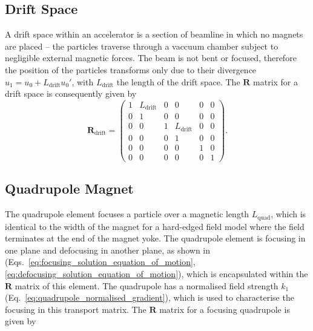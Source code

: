 \documentclass[../main.tex]{subfiles}
\begin{document}
\subsection{Drift Space}

A drift space within an accelerator is a section of beamline in which no magnets are placed -- the particles traverse through a vaccuum chamber subject to negligible external magnetic forces. The beam is not bent or focused, therefore the position of the particles transforms only due to their divergence $u_{1} = u_{0} + L_{\mathrm{drift}}u_{0}'$, with $L_{\mathrm{drift}}$ the length of the drift space. The $\boldsymbol{R}$ matrix for a drift space is consequently given by  
\begin{equation}
\boldsymbol{R}_{\mathrm{drift}} =
\begin{pmatrix}
1 & L_{\mathrm{drift}} & 0 & 0 & 0 & 0 \\
0 & 1 & 0 & 0 & 0 & 0 \\
0 & 0 & 1 & L_{\mathrm{drift}} & 0 & 0 \\
0 & 0 & 0 & 1 & 0 & 0 \\
0 & 0 & 0 & 0 & 1 & 0 \\
0 & 0 & 0 & 0 & 0 & 1
\end{pmatrix}.
\label{eq:drift_matrix}    
\end{equation}

\subsection{Quadrupole Magnet}

The quadrupole element focuses a particle over a magnetic length $L_{\mathrm{quad}}$, which is identical to the width of the magnet for a hard-edged field model where the field terminates at the end of the magnet yoke. The quadrupole element is focusing in one plane and defocusing in another plane, as shown in (Eqs.~\ref{eq:focusing_solution_equation_of_motion}, \ref{eq:defocusing_solution_equation_of_motion}), which is encapsulated within the $\boldsymbol{R}$ matrix of this element. The quadrupole has a normalised field strength $k_{1}$ (Eq.~\ref{eq:quadrupole_normalised_gradient}), which is used to characterise the focusing in this transport matrix. The $\boldsymbol{R}$ matrix for a focusing quadrupole is given by
\end{document}
